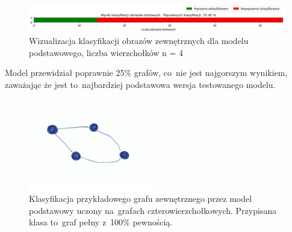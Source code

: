 \begin{figure}[ht]
	\centering
	\includegraphics[width=15.5cm]{resources/tests/images/v3/base4_bar.png}
	\caption{Wizualizacja klasyfikacji obrazów zewnętrznych dla modelu podstawowego, liczba wierzchołków n = 4}
	\label{Fig:tests-base-1c}
\end{figure}
\FloatBarrier

Model przewidział poprawnie 25\% grafów, co~nie jest najgorszym wynikiem,
zaważając że jest to~najbardziej podstawowa wersja testowanego modelu.

\begin{figure}[ht]
	\centering
	\includegraphics[height=4cm]{../graph_classification/test_graphs/drawn/cycle-5.png}
	\caption{Klasyfikacja przykładowego grafu zewnętrznego przez model podstawowy uczony na~grafach czterowierzchołkowych.
		Przypisana klasa to~graf pełny z~100\% pewnością.}
	\label{Fig:tests-base-1d}
\end{figure}
\FloatBarrier




